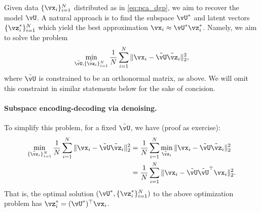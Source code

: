 \documentclass[../../book-main.tex]{subfiles}
\begin{document}
Given data \(\{\vx_{i}\}_{i = 1}^{N}\) distributed as in \eqref{eq:pca_dgp}, we
aim to recover the model \(\vU\). A natural approach is to find the subspace
\(\vU^{\ast}\) and latent vectors \(\{\vz_{i}^{\ast}\}_{i = 1}^{N}\) which
yield the best approximation \(\vx_{i} \approx \vU^{\ast}\vz_{i}^{\ast}\). Namely, we aim to solve the problem 
\begin{equation}\label{eq:pca_sparse_recovery_problem}
    \min_{\tilde{\vU}, \{\tilde{\vz}_{i}\}_{i = 1}^{N}}\frac{1}{N}\sum_{i = 1}^{N}\norm{\vx_{i} - \tilde{\vU}\tilde{\vz}_{i}}_{2}^{2},
\end{equation}
where $\tilde{\vU}$ is constrained to be an orthonormal matrix, as above. We will omit
this constraint in similar statements below for the sake of concision.

\paragraph{Subspace encoding-decoding via denoising.}
To simplify this problem, for a fixed \(\tilde{\vU}\), we have (proof as exercise):
\begin{align}
    \min_{\{\tilde{\vz}_{i}\}_{i = 1}^{N}}\frac{1}{N}\sum_{i = 1}^{N}\norm{\vx_{i} - \tilde{\vU}\tilde{\vz}_{i}}_{2}^{2} 
    &= \frac{1}{N}\sum_{i = 1}^{N}\min_{\tilde{\vz}_{i}}\norm{\vx_{i} - \tilde{\vU}\tilde{\vz}_{i}}_{2}^{2} \\
    &= \frac{1}{N}\sum_{i = 1}^{N}\norm{\vx_{i} - \tilde{\vU}\tilde{\vU}^{\top}\vx_{i}}_{2}^{2}. 
\end{align}
That is, the optimal solution \((\vU^{\ast}, \{\vz_{i}^{\ast}\}_{i = 1}^{N})\) to the above optimization problem has $\vz_i^{\ast} = (\vU^{\ast})^\top\vx_i$.
\end{document}
